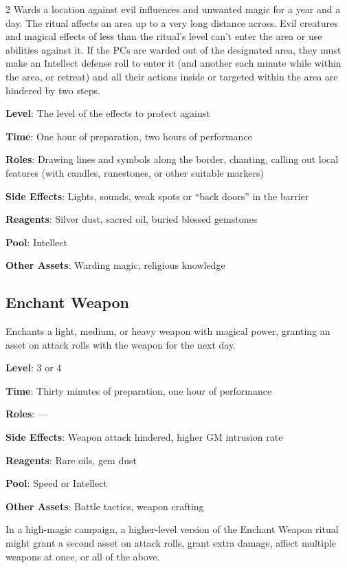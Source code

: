 \begin{multicols}{2}
Wards a location against evil influences and unwanted magic for a year and a day. The ritual affects an area up to a very long distance across. Evil creatures and magical effects of less than the ritual’s level can’t enter the area or use abilities against it. If the PCs are warded out of the designated area, they must make an Intellect defense roll to enter it (and another each minute while within the area, or retreat) and all their actions inside or targeted within the area are hindered by two steps. 

\textbf{Level}: The level of the effects to protect against 

\textbf{Time}: One hour of preparation, two hours of performance 

\textbf{Roles}: Drawing lines and symbols along the border, chanting, calling out local features (with candles, runestones, or other suitable markers) 

\textbf{Side Effects}: Lights, sounds, weak spots or “back doors” in the barrier 

\textbf{Reagents}: Silver dust, sacred oil, buried blessed gemstones 

\textbf{Pool}: Intellect 

\textbf{Other Assets}: Warding magic, religious knowledge 

\subsection{Enchant Weapon}

Enchants a light, medium, or heavy weapon with magical power, granting an asset on attack rolls with the weapon for the next day. 

\textbf{Level}: 3 or 4 

\textbf{Time}: Thirty minutes of preparation, one hour of performance 

\textbf{Roles}: — 

\textbf{Side Effects}: Weapon attack hindered, higher GM intrusion rate

\textbf{Reagents}: Rare oils, gem dust 

\textbf{Pool}: Speed or Intellect 

\textbf{Other Assets}: Battle tactics, weapon crafting

In a high-magic campaign, a higher-level version of the Enchant Weapon ritual might grant a second asset on attack rolls, grant extra damage, affect multiple weapons at once, or all of the above.


\end{multicols}
